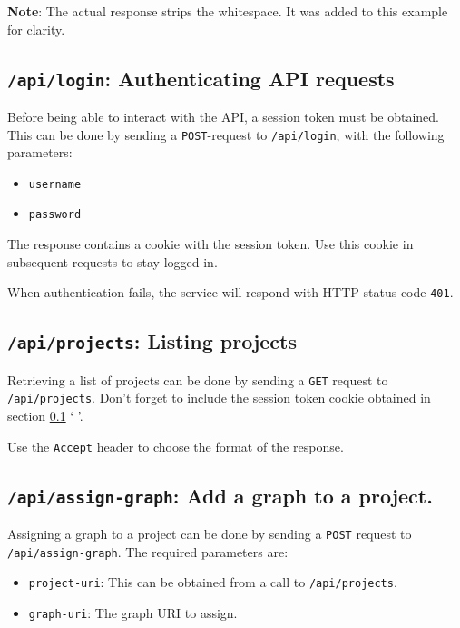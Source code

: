 \textbf{Note}: The actual response strips the whitespace.  It was added to
this example for clarity.

\subsection{\texttt{/api/login}: Authenticating API requests}
\label{sec:api-login}

  Before being able to interact with the API, a session token must be obtained.
  This can be done by sending a \texttt{POST}-request to \texttt{/api/login},
  with the following parameters:
  \begin{itemize}
    \item{\texttt{username}}
    \item{\texttt{password}}
  \end{itemize}

  The response contains a cookie with the session token.  Use this cookie in
  subsequent requests to stay logged in.

  When authentication fails, the service will respond with HTTP status-code
  \texttt{401}.

\subsection{\texttt{/api/projects}: Listing projects}

  Retrieving a list of projects can be done by sending a \texttt{GET} request
  to \texttt{/api/projects}.  Don't forget to include the session token cookie
  obtained in section \ref{sec:api-login} {\color{LinkGray}`%
    '}.

  Use the \texttt{Accept} header to choose the format of the response.

\subsection{\texttt{/api/assign-graph}: Add a graph to a project.}

  Assigning a graph to a project can be done by sending a \texttt{POST} request
  to \texttt{/api/assign-graph}.  The required parameters are:

  \begin{itemize}
    \item{\texttt{project-uri}: This can be obtained from a call to
      \texttt{/api/projects}.}
    \item{\texttt{graph-uri}: The graph URI to assign.}
  \end{itemize}

